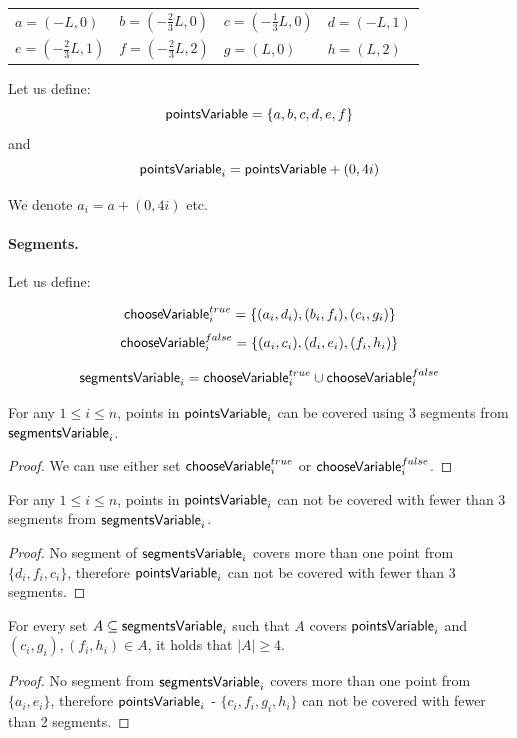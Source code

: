 \begin{center}
\begin{tabular}{ l l l l}
	$a = (-L, 0)$ &
	$b = (-\frac{2}{3}L, 0)$ & 
	$c = (-\frac{1}{3}L, 0)$ & 
	$d = (-L, 1)$ \\  
	$e = (-\frac{2}{3}L, 1)$ & 
	$f = (-\frac{2}{3}L, 2)$ &
	$g = (L, 0)$ &
	$h = (L, 2)$
\end{tabular}
\end{center}


Let us define: $$\mathsf{pointsVariable} =  \{a, b, c, d, e, f\}$$
and $$\mathsf{pointsVariable}_{i} = \mathsf{pointsVariable} + (0, 4i)$$

We denote $a_i = a + (0,4i)$ etc.

\paragraph{Segments.}

\newcommand{\xTrueSegment}[1]{(c_{#1}, g_{#1})}
\newcommand{\xFalseSegment}[1]{(f_{#1}, h_{#1})}
\newcommand{\orTrueSegment}[2]{(t_{#1, #2}, v_{#1, #2})}

Let us define:

$$\mathsf{chooseVariable}^{true}_{i} =\{ (a_i, d_i), (b_i, f_i), (c_i, g_i)\}$$
$$\mathsf{chooseVariable}^{false}_{i} = \{(a_i, c_i), (d_i, e_i), (f_i, h_i)\}$$

$$\mathsf{segmentsVariable}_{i} = \mathsf{chooseVariable}^{true}_{i} \cup \mathsf{chooseVariable}^{false}_{i}$$


\begin{lemma}
\label{choose_variables_solution}
For any $1 \le i \le n$, points in $\mathsf{pointsVariable}_{i}$
can be covered using 3 segments from $\mathsf{segmentsVariable}_{i}$.
\end{lemma}

\begin{proof}
We can use either set $\mathsf{chooseVariable}^{true}_{i}$ or $\mathsf{chooseVariable}^{false}_{i}$.
\end{proof}

\begin{lemma}
\label{choose_variables_no_less}
For any $1 \le i \le n$, points in $\mathsf{pointsVariable}_{i}$
can not be covered with fewer than 3 segments from $\mathsf{segmentsVariable}_{i}$.
\end{lemma}

\begin{proof}
No segment of $\mathsf{segmentsVariable}_{i}$ covers more than one point from
$\{d_i, f_i, c_i\}$, therefore $\mathsf{pointsVariable}_{i}$ can
not be covered with fewer than 3 segments.
\end{proof}

\begin{lemma}
\label{choose_variables_both}
For every set $A \subseteq \mathsf{segmentsVariable}_{i}$ such that $A$ covers $\mathsf{pointsVariable}_{i}$
and $\xTrueSegment{i}, \xFalseSegment{i} \in A$,
it holds that $|A| \ge 4$.
\end{lemma}
\begin{proof}
No segment from $\mathsf{segmentsVariable}_{i}$ covers more than one point from
$\{a_i, e_i\}$,
therefore 
$\mathsf{pointsVariable}_{i}$ - $\{c_i, f_i, g_i, h_i\}$
can not be covered with fewer than 2 segments.
\end{proof}



